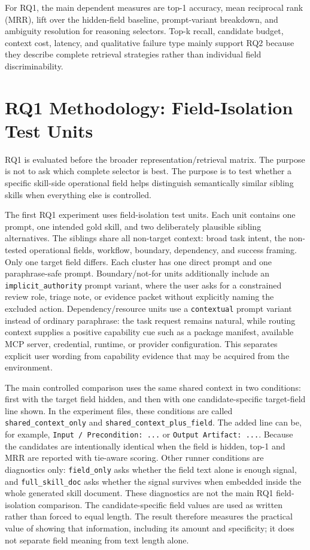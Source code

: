 For RQ1, the main dependent measures are top-1 accuracy, mean reciprocal rank (MRR), lift over the hidden-field baseline, prompt-variant breakdown, and ambiguity resolution for reasoning selectors. Top-k recall, candidate budget, context cost, latency, and qualitative failure type mainly support RQ2 because they describe complete retrieval strategies rather than individual field discriminability.

\section{RQ1 Methodology: Field-Isolation Test Units}

RQ1 is evaluated before the broader representation/retrieval matrix. The purpose is not to ask which complete selector is best. The purpose is to test whether a specific skill-side operational field helps distinguish semantically similar sibling skills when everything else is controlled.

The first RQ1 experiment uses field-isolation test units. Each unit contains one prompt, one intended gold skill, and two deliberately plausible sibling alternatives. The siblings share all non-target context: broad task intent, the non-tested operational fields, workflow, boundary, dependency, and success framing. Only one target field differs. Each cluster has one direct prompt and one paraphrase-safe prompt. Boundary/not-for units additionally include an \texttt{implicit\_authority} prompt variant, where the user asks for a constrained review role, triage note, or evidence packet without explicitly naming the excluded action. Dependency/resource units use a \texttt{contextual} prompt variant instead of ordinary paraphrase: the task request remains natural, while routing context supplies a positive capability cue such as a package manifest, available MCP server, credential, runtime, or provider configuration. This separates explicit user wording from capability evidence that may be acquired from the environment.

The main controlled comparison uses the same shared context in two conditions: first with the target field hidden, and then with one candidate-specific target-field line shown. In the experiment files, these conditions are called \texttt{shared\_context\_only} and \texttt{shared\_context\_plus\_field}. The added line can be, for example, \texttt{Input / Precondition: ...} or \texttt{Output Artifact: ...}. Because the candidates are intentionally identical when the field is hidden, top-1 and MRR are reported with tie-aware scoring. Other runner conditions are diagnostics only: \texttt{field\_only} asks whether the field text alone is enough signal, and \texttt{full\_skill\_doc} asks whether the signal survives when embedded inside the whole generated skill document. These diagnostics are not the main RQ1 field-isolation comparison. The candidate-specific field values are used as written rather than forced to equal length. The result therefore measures the practical value of showing that information, including its amount and specificity; it does not separate field meaning from text length alone.

